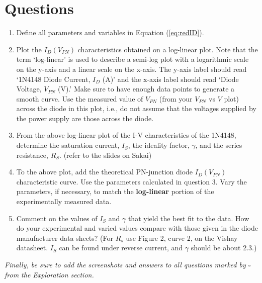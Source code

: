 \documentclass[12pt]{../manual}
\begin{document}
\section{Questions}
\begin{enumerate}
\item Define all parameters and variables in Equation (\ref{eq:redID}).
\item Plot the $I_D(V_{PN})$ characteristics obtained on a log-linear plot. Note that the term `log-linear' is used to describe a semi-log plot with a logarithmic scale on the y-axis and a linear scale on the x-axis. The y-axis label should read `1N4148 Diode Current, $I_D$ (A)' and the x-axis label should read `Diode Voltage, $V_{PN}$ (V).' Make sure to have enough data points to generate a smooth curve. Use the measured value of $V_{PN}$ (from your $V_{PN}$ vs $V$ plot) across the diode in this plot, i.e., do not assume that the voltages supplied by the power supply are those across the diode.
\item From the above log-linear plot of the I-V characteristics of the 1N4148, determine the saturation current, $I_S$, the ideality factor, $\gamma$, and the series resistance, $R_S$. (refer to the slides on Sakai)
\item To the above plot, add the theoretical PN-junction diode $I_D(V_{PN})$ characteristic curve. Use the parameters calculated in question 3. Vary the parameters, if necessary, to match the \textbf{log-linear} portion of the experimentally measured data.
\item Comment on the values of $I_S$ and $\gamma$ that yield the best fit to the data. How do your experimental and varied values compare with those given in the diode manufacturer data sheets? (For $R_s$ use Figure 2, curve 2, on the Vishay datasheet. $I_S$ can be found under reverse current, and $\gamma$ should be about 2.3.)
\end{enumerate}
\textit{Finally, be sure to add the screenshots and answers to all questions marked by $\square$ from the Exploration section.}

\newpage
\end{document}
